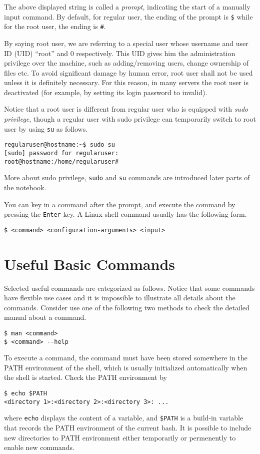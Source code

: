 The above displayed string is called a \textit{prompt}, indicating the start of a manually input command. By default, for regular user, the ending of the prompt is \verb|$| while for the root user, the ending is \verb|#|.

By saying root user, we are referring to a special user whose username and user ID (UID) ``root'' and $0$ respectively. This UID gives him the administration privilege over the machine, such as adding/removing users, change ownership of files etc. To avoid significant damage by human error, root user shall not be used unless it is definitely necessary. For this reason, in many servers the root user is deactivated (for example, by setting its login password to invalid).

Notice that a root user is different from regular user who is equipped with \textit{sudo privilege}, though a regular user with sudo privilege can temporarily switch to root user by using \verb|su| as follows.
\begin{verbatim}
regularuser@hostname:~$ sudo su
[sudo] password for regularuser:
root@hostname:/home/regularuser#
\end{verbatim}

More about sudo privilege, \verb|sudo| and \verb|su| commands are introduced later parts of the notebook.

You can key in a command after the prompt, and execute the command by pressing the \verb|Enter| key. A Linux shell command usually has the following form.
\begin{verbatim}
$ <command> <configuration-arguments> <input>
\end{verbatim}

\section{Useful Basic Commands}

Selected useful commands are categorized as follows. Notice that some commands have flexible use cases and it is impossible to illustrate all details about the commands. Consider use one of the following two methods to check the detailed manual about a command.
\begin{verbatim}
$ man <command>
$ <command> --help
\end{verbatim}

To execute a command, the command must have been stored somewhere in the PATH environment of the shell, which is usually initialized automatically when the shell is started. Check the PATH environment by
\begin{verbatim}
$ echo $PATH
<directory 1>:<directory 2>:<directory 3>: ...
\end{verbatim}
where \verb|echo| displays the content of a variable, and \verb|$PATH| is a build-in variable that records the PATH environment of the current bash. It is possible to include new directories to PATH environment either temporarily or permenently to enable new commands.

